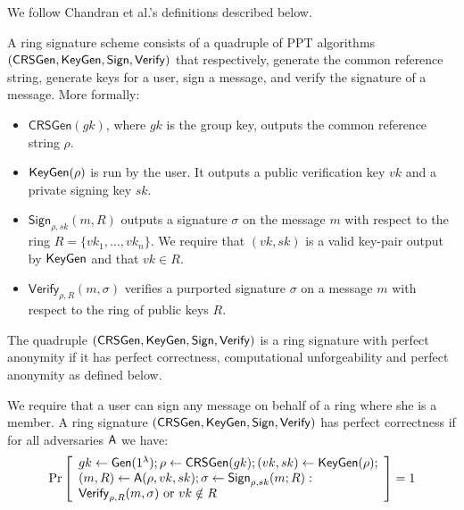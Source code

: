 We follow Chandran et al.'s definitions \cite{ICALP:ChaGroSah07} described below.

\begin{definition}
A ring signature scheme consists of a quadruple of
PPT algorithms $(\mathsf{CRSGen}, \mathsf{KeyGen}, \mathsf{Sign}, \mathsf{Verify})$ that respectively, generate the common
reference string, generate keys for a user, sign a message, and verify the signature of a
message. More formally:
\begin{itemize}
\item $\mathsf{CRSGen}(gk)$, where $gk$ is the group key, outputs the common reference
string $\rho$.
\item $\mathsf{KeyGen}(\rho)$ is run by the user. It outputs a public verification key $vk$ and a private
signing key $sk$.
\item $\mathsf{Sign}_{\rho,sk}(m, R)$ outputs a signature $\sigma$ on the message $m$ with respect to the ring
$R = \{vk_1,\ldots,vk_n\}$. We require that $(vk, sk)$ is a valid key-pair output by $\mathsf{KeyGen}$
and that $vk \in R$.
\item $\mathsf{Verify}_{\rho,R}(m, \sigma)$ verifies a purported signature $\sigma$ on a message $m$ with respect to
the ring of public keys $R$.
\end{itemize}
The quadruple $(\mathsf{CRSGen}, \mathsf{KeyGen}, \mathsf{Sign}, \mathsf{Verify})$ is a ring signature with perfect
anonymity if it has perfect correctness, computational unforgeability and perfect
anonymity as defined below.
\end{definition}

\begin{definition}
We require that a user can sign any message on behalf of a ring where she is a member. A ring signature $(\mathsf{CRSGen},\allowbreak \mathsf{KeyGen}, \mathsf{Sign}, \mathsf{Verify})$
has perfect correctness if for all adversaries $\mathsf{A}$ we have:
$$
\Pr\left[\begin{array}{l}
gk\gets\mathsf{Gen}(1^\lambda);\rho\gets\mathsf{CRSGen}(gk);(vk,sk)\gets\mathsf{KeyGen}(\rho);\\
(m,R)\gets\mathsf{A}(\rho,vk,sk);\sigma\gets\mathsf{Sign}_{\rho,sk}(m;R):\\
\mathsf{Verify}_{\rho,R}(m,\sigma)\text{ or }vk\notin R
\end{array}\right]=1
$$
\end{definition}

